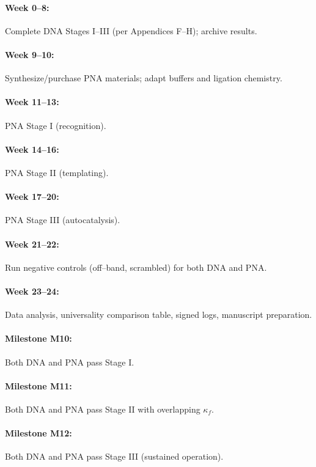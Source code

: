\documentclass[11pt]{article}
\begin{document}
\paragraph{Week 0–8:} Complete DNA Stages I–III (per Appendices F–H); archive results.

\paragraph{Week 9–10:} Synthesize/purchase PNA materials; adapt buffers and ligation chemistry.

\paragraph{Week 11–13:} PNA Stage I (recognition).

\paragraph{Week 14–16:} PNA Stage II (templating).

\paragraph{Week 17–20:} PNA Stage III (autocatalysis).

\paragraph{Week 21–22:} Run negative controls (off–band, scrambled) for both DNA and PNA.

\paragraph{Week 23–24:} Data analysis, universality comparison table, signed logs, manuscript preparation.

\paragraph{Milestone M10:} Both DNA and PNA pass Stage I.

\paragraph{Milestone M11:} Both DNA and PNA pass Stage II with overlapping $\kappa_f$.

\paragraph{Milestone M12:} Both DNA and PNA pass Stage III (sustained operation).
\end{document}
